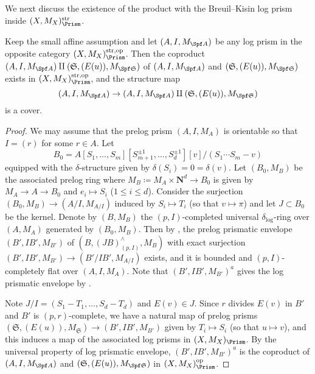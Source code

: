 We next discuss the existence of the product with the Breuil--Kisin log prism inside $(X,M_X)_\Prism^\mathrm{str}$. 

\begin{lem}\label{lem:coproduct with fkS is a covering}
Keep the small affine assumption and let $(A,I,M_{\Spf A})$ be any log prism in the opposite category $(X,M_X)_\Prism^{\mathrm{str},\mathrm{op}}$. Then the coproduct $(A,I,M_{\Spf A})\amalg (\mathfrak{S}, (E(u)), M_{\Spf \mathfrak{S}})$ of $(A,I,M_{\Spf A})$ and $(\mathfrak{S}, (E(u)), M_{\Spf \mathfrak{S}})$ exists in  $(X,M_X)_\Prism^{\mathrm{str},\mathrm{op}}$, and the structure map 
\[
(A,I,M_{\Spf A}) \to (A,I,M_{\Spf A})\amalg (\mathfrak{S}, (E(u)), M_{\Spf \mathfrak{S}}) 
\]
is a cover.
\end{lem}


\begin{proof}
We may assume that the prelog prism $(A, I, M_A)$ is orientable so that $I = (r)$ for some $r \in A$. Let 
\[
B_0 = A[S_1, \ldots, S_m][S_{m+1}^{\pm 1}, \ldots, S_{d}^{\pm 1}][v]/(S_1\cdots S_m -v)
\]
equipped with the $\delta$-structure given by $\delta(S_i) = 0 = \delta(v)$. Let $(B_0, M_B)$ be the associated prelog ring where $M_B\coloneqq M_A \times \mathbf{N}^d \rightarrow B_0$ is given by $M_A \rightarrow A \rightarrow B_0$ and $e_i \mapsto S_i$ ($1\leq i\leq d$). Consider the surjection $(B_0, M_B) \rightarrow (A/I, M_{A/I})$ induced by $S_i \mapsto T_i$ (so that $v \mapsto \pi$) and let $J\subset B_0$ be the kernel. Denote by $(B, M_B)$ the $(p, I)$-completed universal $\delta_{\mathrm{log}}$-ring over $(A, M_A)$ generated by $(B_0, M_B)$. Then by \cite[Prop.~3.9]{koshikawa}, the prelog prismatic envelope $(B', IB', M_{B'})$ of $(B, (JB)^{\wedge}_{(p, I)}, M_B)$ with exact surjection $(B', IB', M_{B'}) \rightarrow (B'/IB', M_{A/I})$ exists, and it is bounded and $(p, I)$-completely flat over $(A, I, M_A)$. Note that $(B', IB', M_{B'})^a$ gives the log prismatic envelope by \cite[Prop.~3.7]{koshikawa}. 

Note $J/I = (S_1-T_1, \ldots, S_d-T_d)$ and $E(v) \in J$. Since $r$ divides $E(v)$ in $B'$ and $B'$ is $(p, r)$-complete, we have a natural map of prelog prisms $(\mathfrak{S}, (E(u)), M_{\mathfrak{S}}) \rightarrow (B', IB', M_{B'})$ given by $T_i \mapsto S_i$ (so that $u \mapsto v$), and this induces a map of the associated log prisms in $(X, M_X)_{\Prism}$. By the universal property of log prismatic envelope, $(B', IB', M_{B'})^a$ is the coproduct of $(A,I,M_{\Spf A})$ and $(\mathfrak{S}, (E(u)), M_{\Spf \mathfrak{S}})$ in $(X, M_X)_{\Prism}^\mathrm{op}$. 


\end{proof}

